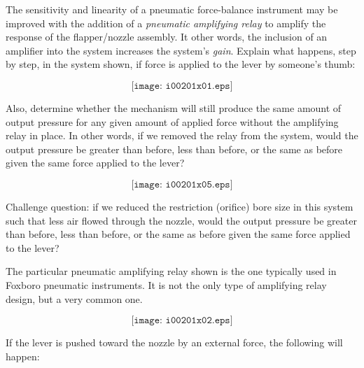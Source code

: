 

The sensitivity and linearity of a pneumatic force-balance instrument may be improved with the addition of a {\it pneumatic amplifying relay} to amplify the response of the flapper/nozzle assembly.  It other words, the inclusion of an amplifier into the system increases the system's {\it gain}.  Explain what happens, step by step, in the system shown, if force is applied to the lever by someone's thumb:

$$\texttt{[image: i00201x01.eps]}$$

\vskip 10pt

Also, determine whether the mechanism will still produce the same amount of output pressure for any given amount of applied force without the amplifying relay in place.  In other words, if we removed the relay from the system, would the output pressure be greater than before, less than before, or the same as before given the same force applied to the lever?

$$\texttt{[image: i00201x05.eps]}$$

\vskip 10pt

Challenge question: if we reduced the restriction (orifice) bore size in this system such that less air flowed through the nozzle, would the output pressure be greater than before, less than before, or the same as before given the same force applied to the lever?







The particular pneumatic amplifying relay shown is the one typically used in Foxboro pneumatic instruments.  It is not the only type of amplifying relay design, but a very common one.

$$\texttt{[image: i00201x02.eps]}$$

If the lever is pushed toward the nozzle by an external force, the following will happen:


